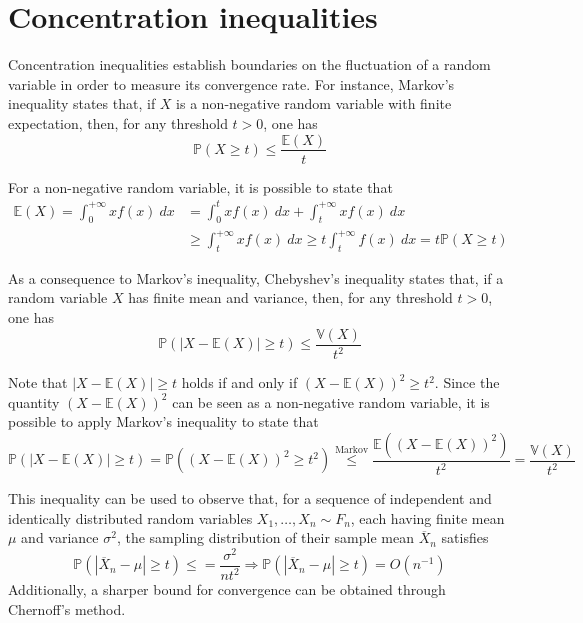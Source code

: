 \documentclass{report}
\begin{document}
\section{Concentration inequalities}
Concentration inequalities establish boundaries on the fluctuation of a random variable in order to measure its convergence rate. \newline
For instance, Markov's inequality states that, if $\displaystyle X$ is a non-negative random variable with finite expectation, then, for any threshold $\displaystyle t > 0$, one has
\[\mathbb{P}(X \ge t) \leq \frac{\mathbb{E}(X)}{t}\]
\begin{proofbox}
    For a non-negative random variable, it is possible to state that
    \begin{align*}
        \mathbb{E}(X) = \int_0^{+\infty} xf(x) \ dx
            &= \int_0^t xf(x) \ dx + \int_t^{+\infty} xf(x) \ dx \\
            &\ge \int_t^{+\infty} xf(x) \ dx \ge t\int_t^{+\infty} f(x) \ dx = t\mathbb{P}(X \ge t)
    \end{align*}
\end{proofbox}
\noindent As a consequence to Markov's inequality, Chebyshev's inequality states that, if a random variable $\displaystyle X$ has finite mean and variance, then, for any threshold $\displaystyle t > 0$, one has
\[\mathbb{P}(|X - \mathbb{E}(X)| \ge t) \leq \frac{\mathbb{V}(X)}{t^2}\]
\begin{proofbox}
    Note that $\displaystyle |X - \mathbb{E}(X)| \ge t$ holds if and only if $\displaystyle (X - \mathbb{E}(X))^2 \ge t^2$. \newline
    Since the quantity $\displaystyle (X - \mathbb{E}(X))^2$ can be seen as a non-negative random variable, it is possible to apply Markov's inequality to state that
    \[\mathbb{P}(|X - \mathbb{E}(X)| \ge t) = \mathbb{P}((X - \mathbb{E}(X))^2 \ge t^2) \stackrel{\text{Markov}}{\leq} \frac{\mathbb{E}((X - \mathbb{E}(X))^2)}{t^2} = \frac{\mathbb{V}(X)}{t^2}\]
\end{proofbox}
\noindent This inequality can be used to observe that, for a sequence of independent and identically distributed random variables $\displaystyle X_1, \dots, X_n \sim F_n$, each having finite mean $\displaystyle \mu$ and variance $\displaystyle \sigma^2$, the sampling distribution of their sample mean $\displaystyle \overline{X}_n$ satisfies
\[\mathbb{P}(|\overline{X}_n - \mu| \ge t) \leq = \frac{\sigma^2}{nt^2} \Rightarrow \mathbb{P}(|\overline{X}_n - \mu| \ge t) = O(n^{-1})\]
Additionally, a sharper bound for convergence can be obtained through Chernoff's method. \newline
\end{document}
